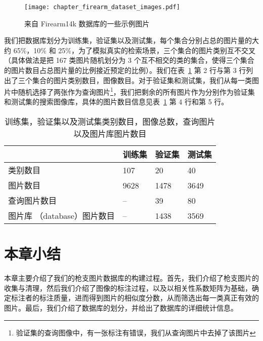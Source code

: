 \begin{figure}[t]
	\centering
	\texttt{[image: chapter\_firearm\_dataset\_images.pdf]}
	\caption{来自 Firearm14k 数据库的一些示例图片}
	\label{fig:dataset_sample_images}
\end{figure}

我们把数据库划分为训练集，验证集以及测试集，每个集合分别占总的图片量的大约 65\%，10\% 和 25\%，为了模拟真实的检索场景，三个集合的图片类别互不交叉 （具体做法是把 167 类图片随机划分为 3 个互不相交的类的集合，使得三个集合的图片数目占总图片量的比例接近预定的比例）。我们在表~\ref{table:train_val_test_stat} 第 2 行与第 3 行列出了三个集合的图片类别数目，图像数目。对于验证集和测试集，我们从每一类图片中随机选择了两张作为查询图片\footnote{验证集的查询图像中，有一张标注有错误，我们从查询图片中去掉了该图片}，我们把剩余的所有图片作为分别作为验证集和测试集的搜索图像库，具体的图片数目信息见表~\ref{table:train_val_test_stat} 第 4 行和第 5 行。

\begin{table}[!t]
	\centering
	\caption{训练集，验证集以及测试集类别数目，图像总数，查询图片以及图片库图片数目}
	\begin{tabular}{@{}llll@{}}
		\toprule
		          & 训练集 & 验证集 & 测试集 \\
		\midrule
		类别数目 & 107       & 20             & 40       \\
		图片数目 & 9628      & 1478           & 3649     \\
		查询图片数目 & --        & 39             & 80       \\
		图片库 （database）图片数目 & -- & 1438 &  3569 \\
		\bottomrule
	\end{tabular}

	\label{table:train_val_test_stat}
\end{table}

\section{本章小结}
本章主要介绍了我们的枪支图片数据库的构建过程。首先，我们介绍了枪支图片的收集与清理，然后我们介绍了图像的标注过程，以及以相关性系数矩阵为基础，确定标注者的标注质量，进而得到图片的相似度分数，从而筛选出每一类真正有效的图片。最后，我们介绍了数据库的划分，并给出了数据库的详细统计信息。
